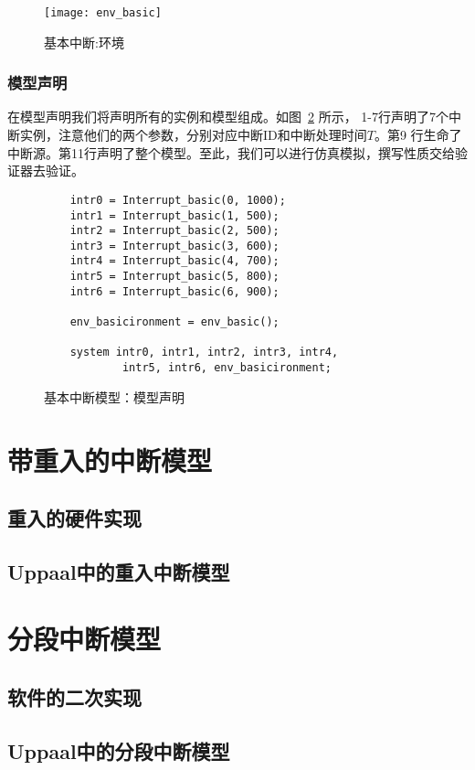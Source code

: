 \begin{figure}[H]
	\centering
	\texttt{[image: env\_basic]}
	\caption{基本中断:环境}
	\label{fig:evn_basic}
\end{figure}

\subsubsection{模型声明}

在模型声明我们将声明所有的实例和模型组成。如图~\ref{fig:basic_model_decl} 所示，
1-7行声明了7个中断实例，注意他们的两个参数，分别对应中断ID和中断处理时间$T$。第9
行生命了中断源。第11行声明了整个模型。至此，我们可以进行仿真模拟，撰写性质交给验
证器去验证。

\begin{figure}[H]
	\centering
	\begin{lstlisting}
	intr0 = Interrupt_basic(0, 1000);
	intr1 = Interrupt_basic(1, 500);
	intr2 = Interrupt_basic(2, 500);
	intr3 = Interrupt_basic(3, 600);
	intr4 = Interrupt_basic(4, 700);
	intr5 = Interrupt_basic(5, 800);
	intr6 = Interrupt_basic(6, 900);
	
	env_basicironment = env_basic();
	
	system intr0, intr1, intr2, intr3, intr4, 
			intr5, intr6, env_basicironment;
	\end{lstlisting}
	\caption{基本中断模型：模型声明}
	\label{fig:basic_model_decl}
\end{figure}

\section{带重入的中断模型}
\label{sec:reentrant}

\subsection{重入的硬件实现}
\label{subsec:reentrant_hardware}

\subsection{Uppaal中的重入中断模型}
\label{subsec:reentrant_uppaal}

\section{分段中断模型}
\label{sec:segment}

\subsection{软件的二次实现}
\label{subsec:segment_software}

\subsection{Uppaal中的分段中断模型}
\label{subsec:segment_uppaal}